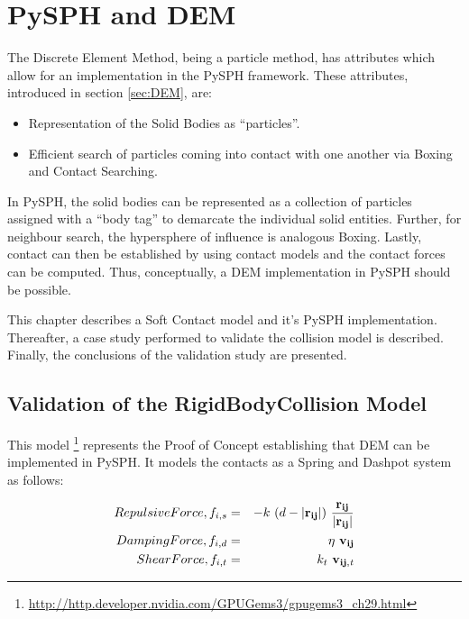 \chapter{PySPH and DEM}

The Discrete Element Method, being a particle method, has attributes which allow for an implementation in the PySPH framework. These attributes, introduced in section \ref{sec:DEM}, are:

\begin{itemize}
\item Representation of the Solid Bodies as ``particles''.
\item Efficient search of particles coming into contact with one another via Boxing and Contact Searching.
\end{itemize}

In PySPH, the solid bodies can be represented as a collection of particles assigned with a ``body tag'' to demarcate the individual solid entities. Further, for neighbour search, the hypersphere of influence is analogous Boxing. Lastly, contact can then be established by using contact models and the contact forces can be computed. Thus, conceptually, a DEM implementation in PySPH should be possible.

This chapter describes a Soft Contact model and it's PySPH implementation. Thereafter, a case study performed to validate the collision model is described. Finally, the conclusions of the validation study are presented.

\section{Validation of the RigidBodyCollision Model}

This model \cite{gpu_gems}\footnote[10]{\url{http://http.developer.nvidia.com/GPUGems3/gpugems3_ch29.html}} represents the Proof of Concept establishing that DEM can be implemented in PySPH. It models the contacts as a Spring and Dashpot system as follows:

\begin{eqnarray}\label{eq:RigidBodyCollision}
Repulsive Force, f_{i,s} &=& -k~(d-|{\bf{r_{ij}}}|)~\frac{{\bf{r_{ij}}}}{|{\bf{r_{ij}}}|} \nonumber\\
Damping Force, f_{i,d} &=& \eta ~ {\bf{v_{ij}}} \\
Shear Force, f_{i,t} &=& k_{t}~{\bf{v_{ij,{\it{t}}}}} \nonumber
\end{eqnarray}

